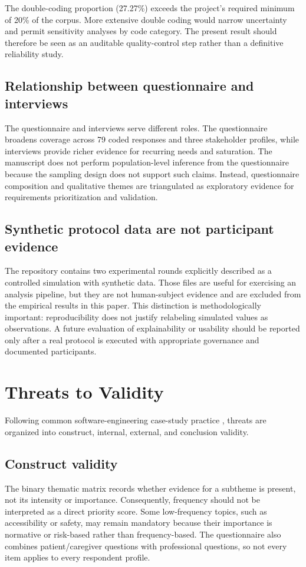 \documentclass[pdflatex,sn-basic]{sn-jnl}
\begin{document}
The double-coding proportion (27.27\%) exceeds the project's required minimum of 20\% of the corpus. More extensive double coding would narrow uncertainty and permit sensitivity analyses by code category. The present result should therefore be seen as an auditable quality-control step rather than a definitive reliability study.

\subsection{Relationship between questionnaire and interviews}
The questionnaire and interviews serve different roles. The questionnaire broadens coverage across 79 coded responses and three stakeholder profiles, while interviews provide richer evidence for recurring needs and saturation. The manuscript does not perform population-level inference from the questionnaire because the sampling design does not support such claims. Instead, questionnaire composition and qualitative themes are triangulated as exploratory evidence for requirements prioritization and validation.

\subsection{Synthetic protocol data are not participant evidence}
The repository contains two experimental rounds explicitly described as a controlled simulation with synthetic data. Those files are useful for exercising an analysis pipeline, but they are not human-subject evidence and are excluded from the empirical results in this paper. This distinction is methodologically important: reproducibility does not justify relabeling simulated values as observations. A future evaluation of explainability or usability should be reported only after a real protocol is executed with appropriate governance and documented participants.

\section{Threats to Validity}
Following common software-engineering case-study practice \citep{runeson2009guidelines,wohlin2012experimentation}, threats are organized into construct, internal, external, and conclusion validity.

\subsection{Construct validity}
The binary thematic matrix records whether evidence for a subtheme is present, not its intensity or importance. Consequently, frequency should not be interpreted as a direct priority score. Some low-frequency topics, such as accessibility or safety, may remain mandatory because their importance is normative or risk-based rather than frequency-based. The questionnaire also combines patient/caregiver questions with professional questions, so not every item applies to every respondent profile.
\end{document}
